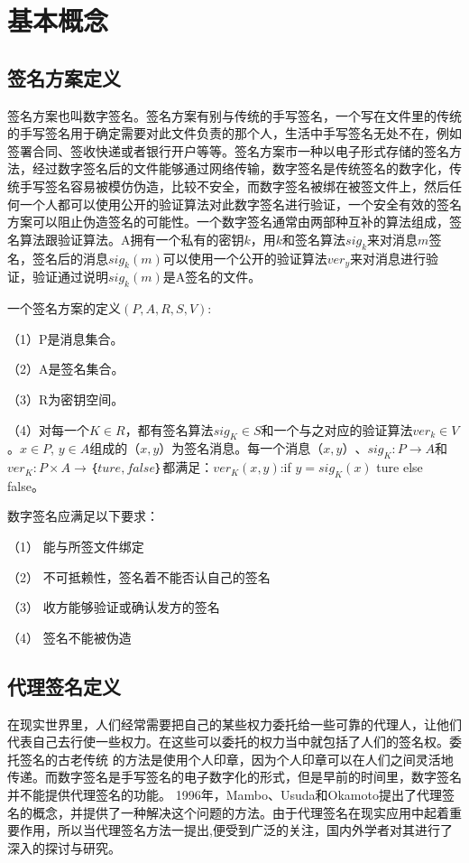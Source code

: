 \section{基本概念}

\subsection{签名方案定义}

签名方案也叫数字签名。签名方案有别与传统的手写签名，一个写在文件里的传统的手写签名用于确定需要对此文件负责的那个人，生活中手写签名无处不在，例如签署合同、签收快递或者银行开户等等。签名方案市一种以电子形式存储的签名方法，经过数字签名后的文件能够通过网络传输，数字签名是传统签名的数字化，传统手写签名容易被模仿伪造，比较不安全，而数字签名被绑在被签文件上，然后任何一个人都可以使用公开的验证算法对此数字签名进行验证，一个安全有效的签名方案可以阻止伪造签名的可能性。一个数字签名通常由两部种互补的算法组成，签名算法跟验证算法。A拥有一个私有的密钥$k$，用$k$和签名算法$sig_k$来对消息$m$签名，签名后的消息$sig_k(m)$可以使用一个公开的验证算法$ver_y$来对消息进行验证，验证通过说明$sig_k(m)$是A签名的文件。

一个签名方案的定义$(P,A,R,S,V)$:

（1）P是消息集合。

（2）A是签名集合。

（3）R为密钥空间。

（4）对每一个$K \in R$，都有签名算法$sig_K \in S$和一个与之对应的验证算法$ver_k \in V$。$x \in P$, $y \in A$组成的$（x,y）$为签名消息。每一个消息$（x,y）$、$sig_K:P→A$和$ver_K:P×A→｛ture,false｝$都满足：$ver_K(x,y)$:if $y=sig_K(x)$ ture else false。

数字签名应满足以下要求：

（1） 能与所签文件绑定

（2） 不可抵赖性，签名着不能否认自己的签名

（3） 收方能够验证或确认发方的签名

（4） 签名不能被伪造

\subsection{代理签名定义}

在现实世界里，人们经常需要把自己的某些权力委托给一些可靠的代理人，让他们代表自己去行使一些权力。在这些可以委托的权力当中就包括了人们的签名权。委托签名的古老传统 的方法是使用个人印章，因为个人印章可以在人们之间灵活地传递。而数字签名是手写签名的电子数字化的形式，但是早前的时间里，数字签名并不能提供代理签名的功能。 1996年，Mambo、Usuda和Okamoto提出了代理签名的概念，并提供了一种解决这个问题的方法。由于代理签名在现实应用中起着重要作用，所以当代理签名方法一提出,便受到广泛的关注，国内外学者对其进行了深入的探讨与研究。

